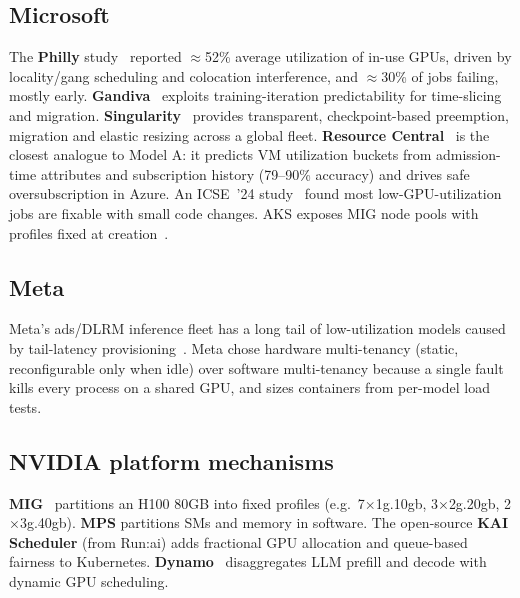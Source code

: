 \subsection{Microsoft}
The \textbf{Philly} study~\cite{jeon2019philly} reported $\approx$52\% average utilization of in-use GPUs, driven by locality/gang scheduling and colocation interference, and $\approx$30\% of jobs failing, mostly early. \textbf{Gandiva}~\cite{xiao2018gandiva} exploits training-iteration predictability for time-slicing and migration. \textbf{Singularity}~\cite{shukla2022singularity} provides transparent, checkpoint-based preemption, migration and elastic resizing across a global fleet. \textbf{Resource Central}~\cite{cortez2017resource} is the closest analogue to Model A: it predicts VM utilization buckets from admission-time attributes and subscription history (79--90\% accuracy) and drives safe oversubscription in Azure. An ICSE~'24 study~\cite{gao2024lowutil} found most low-GPU-utilization jobs are fixable with small code changes. AKS exposes MIG node pools with profiles fixed at creation~\cite{azure2026mig}.

\subsection{Meta}
Meta's ads/DLRM inference fleet has a long tail of low-utilization models caused by tail-latency provisioning~\cite{meta2023multitenancy}. Meta chose hardware multi-tenancy (static, reconfigurable only when idle) over software multi-tenancy because a single fault kills every process on a shared GPU, and sizes containers from per-model load tests.

\subsection{NVIDIA platform mechanisms}
\textbf{MIG}~\cite{nvidia2026mig} partitions an H100 80GB into fixed profiles (e.g.\ 7$\times$1g.10gb, 3$\times$2g.20gb, 2$\times$3g.40gb). \textbf{MPS} partitions SMs and memory in software. The open-source \textbf{KAI Scheduler} (from Run:ai) adds fractional GPU allocation and queue-based fairness to Kubernetes. \textbf{Dynamo}~\cite{nvidia2025dynamo} disaggregates LLM prefill and decode with dynamic GPU scheduling.

